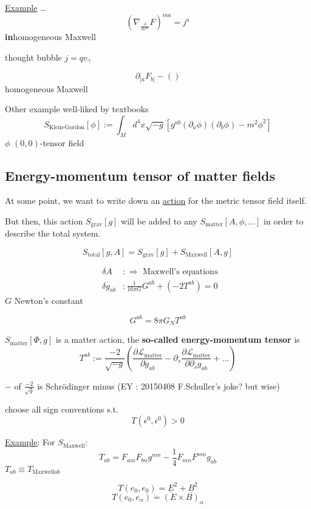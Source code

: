 \underline{Example} \dots 
\[
(\nabla_{\frac{ \partial }{ \partial x^m} }F)^{ma} = j^a
\]
\textbf{in}homogeneous Maxwell

thought bubble $j=qv_{\gamma}$

\[
\partial_{[a}F_{b]} - ()
\]
homogeneous Maxwell

Other example well-liked by textbooks
\[
S_{\text{Klein-Gordon}}[\phi] := \int_M d^4x \sqrt{-g}[g^{ab}(\partial_a \phi) (\partial_b \phi ) - m^2\phi^2]
\]
$\phi$ $(0,0)$-tensor field

\subsection{Energy-momentum tensor of matter fields}

At some point, we want to write down an \underline{action} for the metric tensor field itself.

But then, this action $S_{\text{grav}}[g]$ will be added to any $S_{\text{matter}}[A,\phi,\dots]$ in order to describe the total system.  

\[
S_{\text{total}}[g,A] = S_{\text{grav}}[g] + S_{\text{Maxwell}}[A,g]
\]

\[
\begin{aligned}
  & \delta A     & : \Longrightarrow \text{ Maxwell's equations } \\
  & \delta g_{ab} & : \boxed{ \frac{1}{ 16 \pi G } G^{ab} } + (-2T^{ab} ) = 0 
\end{aligned}
\]
$G$ Newton's constant

\[
G^{ab} = 8 \pi G_N T^{ab}
\]

\begin{definition}
$  S_{\text{matter}}[\Phi,g] $ is a matter action, the \textbf{so-called energy-momentum tensor} is 
\[
T^{ab} := \frac{-2}{ \sqrt{-g}} \left( \frac{ \partial \mathcal{L}_{\text{matter}} }{ \partial g_{ab}} - \partial_s \frac{ \partial \mathcal{L}_{\text{matter}} }{ \partial \partial_s g_{ab}} + \dots \right)
\]
\end{definition}
$-$ of $\frac{-2}{\sqrt{g}}$ is Schr\"{o}dinger minus (EY : 20150408 F.Schuller's joke? but wise)

choose all sign conventions s.t.
\[
T(\epsilon^0,\epsilon^0) >0
\]

\underline{Example}: For $S_{\text{Maxwell}}$:
\[
T_{ab} = F_{am} F_{bn}g^{mn} - \frac{1}{4} F_{mn} F^{mn} g_{ab}
\]
$T_{ab} \equiv T_{\text{Maxwell}ab}$

\[
T(e_0,e_0) = \underline{E}^2+\underline{B}^2
\]
\[
T(e_0,e_{\alpha}) = (E\times B)_{\alpha}
\]

